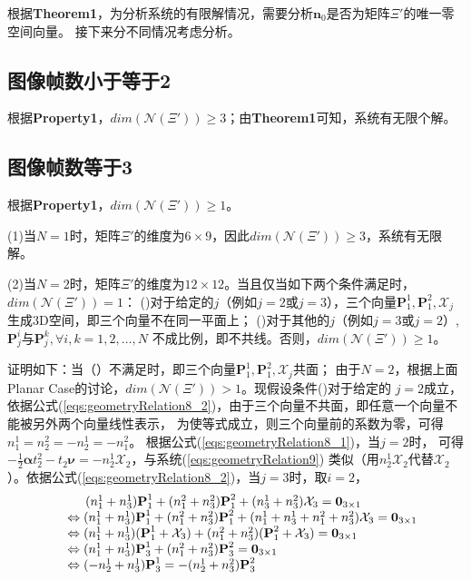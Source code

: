 \documentclass{article}
\begin{document}
\par
根据\textbf{Theorem1}，为分析系统的有限解情况，需要分析$\textbf{n}_0$是否为矩阵$\Xi'$的唯一零空间向量。
接下来分不同情况考虑分析。

\subsection{图像帧数小于等于2}
根据\textbf{Property1}，$dim(\mathcal{N}(\Xi'))\geqslant 3$；由\textbf{Theorem1}可知，系统有无限个解。

\subsection{图像帧数等于3}
根据\textbf{Property1}，$dim(\mathcal{N}(\Xi'))\geqslant 1$。
\par
(1)当$N=1$时，矩阵$\Xi'$的维度为$6\times 9$，因此$dim(\mathcal{N}(\Xi'))\geqslant 3$，系统有无限解。
\par
(2)当$N=2$时，矩阵$\Xi'$的维度为$12\times 12$。当且仅当如下两个条件满足时，$dim(\mathcal{N}(\Xi'))=1$：
()对于给定的$j$（例如$j=2$或$j=3$），三个向量$\textbf{P}_1^1,\textbf{P}_1^2,\mathcal{X}_j$
生成3D空间，即三个向量不在同一平面上；
()对于其他的$j$（例如$j=3$或$j=2$）,$\textbf{P}_j^i$与$\textbf{P}_j^k,\forall i,k=1,2,\dots,N$
不成比例，即不共线。否则，$dim(\mathcal{N}(\Xi'))\geqslant 1$。
\par
证明如下：当（）不满足时，即三个向量$\textbf{P}_1^1,\textbf{P}_1^2,\mathcal{X}_j$共面；
由于$N=2$，根据上面Planar Case的讨论，$dim(\mathcal{N}(\Xi'))>1$。现假设条件()对于给定的
$j=2$成立，依据公式(\ref{eqs:geometryRelation8_2})，由于三个向量不共面，即任意一个向量不能被另外两个向量线性表示，
为使等式成立，则三个向量前的系数为零，可得$n_1^1=n_2^2=-n_2^1=-n_1^2$。
根据公式(\ref{eqs:geometryRelation8_1})，当$j=2$时，
可得$-\frac{1}{2}\mathbf{\alpha}t_2^2-t_2\mathbf{\nu}=-n_2^1\mathcal{X}_2$，与系统(\ref{eqs:geometryRelation9})
类似（用$n_2^1\mathcal{X}_2$代替$\mathcal{X}_2$）。依据公式(\ref{eqs:geometryRelation8_2})，当$j=3$时，取$i=2$，
\begin{equation}
    \begin{array}{ll}
        &\hspace{0.5cm}(n_1^1+n_3^1)\textbf{P}_1^1+(n_1^2+n_3^2)\textbf{P}_1^2+(n_3^1+n_3^2)\mathcal{X}_3=\textbf{0}_{3\times 1}\\
        &\Leftrightarrow
        (n_1^1+n_3^1)\textbf{P}_1^1+(n_1^2+n_3^2)\textbf{P}_1^2+(n_1^1+n_3^1+n_1^2+n_3^2)\mathcal{X}_3=\textbf{0}_{3\times 1}\\
        &\Leftrightarrow
        (n_1^1+n_3^1)(\textbf{P}_1^1+\mathcal{X}_3)+(n_1^2+n_3^2)(\textbf{P}_1^2+\mathcal{X}_3)=\textbf{0}_{3\times 1}\\
        &\Leftrightarrow
        (n_1^1+n_3^1)\textbf{P}_3^1+(n_1^2+n_3^2)\textbf{P}_3^2=\textbf{0}_{3\times 1}\\
        &\Leftrightarrow
        (-n_2^1+n_3^1)\textbf{P}_3^1=-(n_2^1+n_3^2)\textbf{P}_3^2
    \end{array}
\end{equation}
\end{document}
